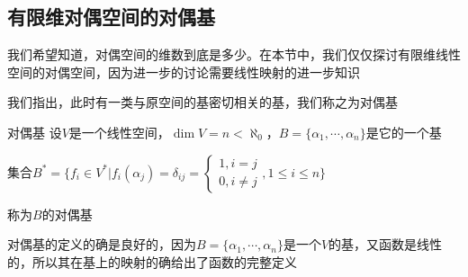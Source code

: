 \documentclass[12pt, a4paper, oneside, UTF8]{ctexbook}
\begin{document}
		\subsection{有限维对偶空间的对偶基}
			我们希望知道，对偶空间的维数到底是多少。在本节中，我们仅仅探讨有限维线性空间的对偶空间，因为进一步的讨论需要线性映射的进一步知识

			我们指出，此时有一类与原空间的基密切相关的基，我们称之为对偶基
			\begin{defn}{对偶基}{}
				设$V$是一个线性空间，$\dim V= n < \aleph_0$，$B=\{\alpha_1,\cdots,\alpha_n\}$是它的一个基

				集合$B^*=\{f_i \in V^*| f_i(\alpha_j) = \delta _{ij} = \begin{cases}
					1, i=j \\
					0, i \neq j
				\end{cases},1 \leqslant i \leqslant n\}$

				称为$B$的对偶基
			\end{defn}
			
			对偶基的定义的确是良好的，因为$B=\{\alpha_1,\cdots,\alpha_n\}$是一个$V$的基，又函数是线性的，所以其在基上的映射的确给出了函数的完整定义
\end{document}
